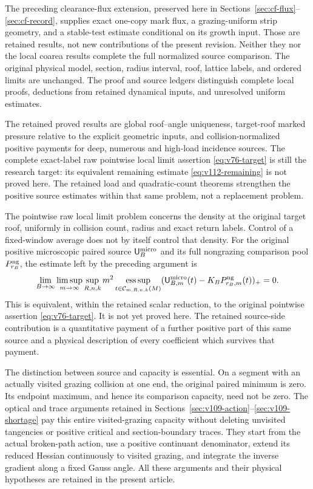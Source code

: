 \documentclass[11pt,reqno]{amsart}
\numberwithin{equation}{section}
\theoremstyle{definition}\newtheorem{definition}[theorem]{Definition}
\theoremstyle{remark}\newtheorem{remark}[theorem]{Remark}
\newcommand{\esssup}{\operatorname*{ess\,sup}}
\begin{document}
The preceding clearance-flux extension, preserved here in
Sections~\ref{sec:cf-flux}--\ref{sec:cf-record}, supplies exact
one-copy mark flux, a grazing-uniform strip geometry, and a
stable-test estimate conditional on its growth input. Those are
retained results, not new contributions of the present revision.
Neither they nor the local coarea results complete the full
normalized source comparison. The original physical model, section,
radius interval, roof, lattice labels, and ordered limits are
unchanged. The proof and source ledgers distinguish complete local
proofs, deductions from retained dynamical inputs, and unresolved
uniform estimates.

The retained proved results are global roof--angle
uniqueness, target-roof marked pressure relative to the explicit
geometric inputs, and collision-normalized positive payments for
deep, numerous and high-load incidence sources. The complete
exact-label raw pointwise local limit assertion
\eqref{eq:v76-target} is still the research target: its equivalent
remaining estimate \eqref{eq:v112-remaining} is not proved here.
The retained load and quadratic-count theorems strengthen the positive
source estimates within that same problem, not a replacement problem.

The pointwise raw local limit problem concerns the density at the
original target roof, uniformly in collision count, radius and exact
return labels. Control of a fixed-window average does not by itself
control that density. For the original positive microscopic paired
source $\mathsf U_B^{\rm micro}$ and its full nongrazing comparison
pool $P_{r_B}^{\rm ng}$, the estimate left by the preceding argument is
\begin{equation}\label{eq:v110-intro-original}
 \lim_{B\to\infty}\limsup_{m\to\infty}\sup_{R,n,k}m^2
 \esssup_{t\in\mathcal C_{m,R,n,k}(M)}
 (\mathsf U_{B,m}^{\rm micro}(t)
                      -K_BP_{r_B,m}^{\rm ng}(t))_+=0.
\end{equation}
This is equivalent, within the retained scalar reduction, to the
original pointwise assertion \eqref{eq:v76-target}. It is not yet
proved here. The retained source-side contribution is a quantitative payment of
a further positive part of this same source and a physical description
of every coefficient which survives that payment.

The distinction between source and capacity is essential. On a
segment with an actually visited grazing collision at one end, the
original paired minimum is zero. Its endpoint maximum, and hence its
comparison capacity, need not be zero. The optical and trace arguments
retained in Sections~\ref{sec:v109-action}--\ref{sec:v109-shortage}
pay this entire visited-grazing capacity without deleting unvisited
tangencies or positive critical and section-boundary traces.
They start from the actual broken-path action, use a positive
continuant denominator, extend its reduced Hessian continuously to
visited grazing, and integrate the inverse gradient along a fixed
Gauss angle. All these arguments and their physical hypotheses are
retained in the present article.
\end{document}
